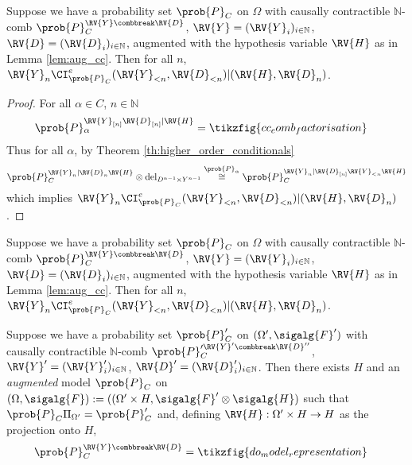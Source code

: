 












\begin{theorem}
Suppose we have a probability set $\prob{P}_C$ on $\Omega$ with causally contractible $\mathbb{N}$-comb $\prob{P}_C^{\RV{Y}\combbreak \RV{D}}$, $\RV{Y}=(\RV{Y}_i)_{i\in\mathbb{N}}$, $\RV{D}=(\RV{D}_i)_{i\in\mathbb{N}}$, augmented with the hypothesis variable $\RV{H}$ as in Lemma \ref{lem:aug_cc}. Then for all $n$, $\RV{Y}_n\CI^e_{\prob{P}_C}(\RV{Y}_{<n},\RV{D}_{<n})|(\RV{H},\RV{D}_n)$.
\end{theorem}

\begin{proof}
For all $\alpha\in C$, $n\in \mathbb{N}$
\begin{align}
	\prob{P}_\alpha^{\RV{Y}_{[n]}\RV{D}_{[n]}|\RV{H}} &= \tikzfig{cc_comb_factorisation}
\end{align}
Thus for all $\alpha$, by Theorem \ref{th:higher_order_conditionals}
\begin{align}
	\prob{P}_C^{\RV{Y}_n|\RV{D}_n\RV{H}}\otimes \mathrm{del}_{D^{n-1}\times Y^{n-1}} \overset{\prob{P}_\alpha}{\cong} \prob{P}_C^{\RV{Y}_n|\RV{D}_{[n]}\RV{Y}_{<n}\RV{H}}
\end{align}
which implies $\RV{Y}_n\CI^e_{\prob{P}_C}(\RV{Y}_{<n},\RV{D}_{<n})|(\RV{H},\RV{D}_n)$.
\end{proof}


\begin{theorem}
Suppose we have a probability set $\prob{P}_C$ on $\Omega$ with causally contractible $\mathbb{N}$-comb $\prob{P}_C^{\RV{Y}\combbreak \RV{D}}$, $\RV{Y}=(\RV{Y}_i)_{i\in\mathbb{N}}$, $\RV{D}=(\RV{D}_i)_{i\in\mathbb{N}}$, augmented with the hypothesis variable $\RV{H}$ as in Lemma \ref{lem:aug_cc}. Then for all $n$, $\RV{Y}_n\CI^e_{\prob{P}_C}(\RV{Y}_{<n},\RV{D}_{<n})|(\RV{H},\RV{D}_n)$.
\end{theorem}

\begin{lemma}\label{lem:aug_cc}
Suppose we have a probability set $\prob{P}_C'$ on $(\Omega',\sigalg{F}')$ with causally contractible $\mathbb{N}$-comb $\prob{P}_C^{\prime \RV{Y}'\combbreak \RV{D}''}$, $\RV{Y}'=(\RV{Y}'_i)_{i\in\mathbb{N}}$, $\RV{D}'=(\RV{D}'_i)_{i\in\mathbb{N}}$. Then there exists $H$ and an \emph{augmented} model $\prob{P}_C$ on $(\Omega,\sigalg{F}):=((\Omega'\times H,\sigalg{F}'\otimes\sigalg{H})$ such that $\prob{P}_C\Pi_{\Omega'}=\prob{P}_C'$ and, defining $\RV{H}:\Omega'\times H\to H$ as the projection onto $H$,
\begin{align}
    \prob{P}_C^{\RV{Y}\combbreak \RV{D}} &= \tikzfig{do_model_representation}\label{eq:do_model_rep}
\end{align}
\end{lemma}

